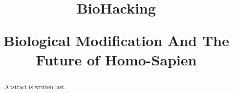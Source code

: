 \documentclass{article}
\title{BioHacking \\
\begin{large} 
    Biological Modification And The Future of Homo-Sapien
\end{large} }	%
\begin{document}
\maketitlepage
\newpage


\begin{abstract}
    Abstract is written last.
\end{abstract}
\newpage

\makeheader	%
\maketitle	%






\newpage
\makeworkscited
\end{document}
